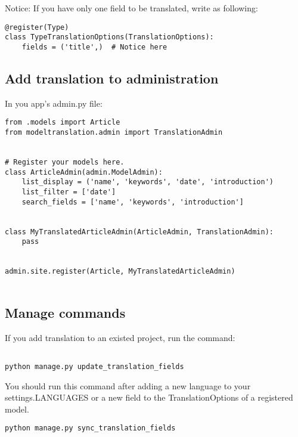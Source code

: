 Notice:
If you have only one field to be translated, write as following:
\begin{lstlisting}
@register(Type)
class TypeTranslationOptions(TranslationOptions):
    fields = ('title',)  # Notice here  
\end{lstlisting}


\subsection{Add translation to administration}

In you app's admin.py file:
\begin{lstlisting}
from .models import Article
from modeltranslation.admin import TranslationAdmin


# Register your models here.
class ArticleAdmin(admin.ModelAdmin):
    list_display = ('name', 'keywords', 'date', 'introduction')
    list_filter = ['date']
    search_fields = ['name', 'keywords', 'introduction']


class MyTranslatedArticleAdmin(ArticleAdmin, TranslationAdmin):
    pass


admin.site.register(Article, MyTranslatedArticleAdmin)
  
\end{lstlisting}


\subsection{Manage commands}



If you add translation to an existed project, run the command:
\begin{lstlisting}

python manage.py update_translation_fields  
\end{lstlisting}



You should run this command after adding a new language to your settings.LANGUAGES or a new field to the TranslationOptions of a registered model.

\begin{lstlisting}
python manage.py sync_translation_fields  
\end{lstlisting}



